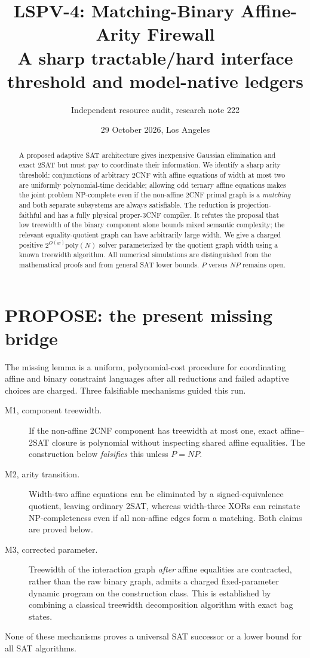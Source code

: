 \documentclass[11pt]{article}
\title{LSPV-4: Matching-Binary Affine-Arity Firewall\\\large A sharp tractable/hard interface threshold and model-native ledgers}
\author{Independent resource audit, research note 222}
\date{29 October 2026, Los Angeles}
\begin{document}
\maketitle
\begin{abstract}
A proposed adaptive SAT architecture gives inexpensive Gaussian elimination and exact 2SAT but must pay to coordinate their information. We identify a sharp arity threshold: conjunctions of arbitrary 2CNF with affine equations of width at most two are uniformly polynomial-time decidable; allowing odd ternary affine equations makes the joint problem NP-complete even if the non-affine 2CNF primal graph is a \emph{matching} and both separate subsystems are always satisfiable. The reduction is projection-faithful and has a fully physical proper-3CNF compiler. It refutes the proposal that low treewidth of the binary component alone bounds mixed semantic complexity; the relevant equality-quotient graph can have arbitrarily large width. We give a charged positive $2^{O(w)}\mathrm{poly}(N)$ solver parameterized by the quotient graph width using a known treewidth algorithm. All numerical simulations are distinguished from the mathematical proofs and from general SAT lower bounds. $P$ versus $NP$ remains open.
\end{abstract}

\section{PROPOSE: the present missing bridge}
The missing lemma is a uniform, polynomial-cost procedure for coordinating affine and binary constraint languages after all reductions and failed adaptive choices are charged. Three falsifiable mechanisms guided this run.
\begin{description}
\item[M1, component treewidth.] If the non-affine 2CNF component has treewidth at most one, exact affine--2SAT closure is polynomial without inspecting shared affine equalities. The construction below \emph{falsifies} this unless $P=NP$.
\item[M2, arity transition.] Width-two affine equations can be eliminated by a signed-equivalence quotient, leaving ordinary 2SAT, whereas width-three XORs can reinstate NP-completeness even if all non-affine edges form a matching. Both claims are proved below.
\item[M3, corrected parameter.] Treewidth of the interaction graph \emph{after} affine equalities are contracted, rather than the raw binary graph, admits a charged fixed-parameter dynamic program on the construction class. This is established by combining a classical treewidth decomposition algorithm with exact bag states.
\end{description}
None of these mechanisms proves a universal SAT successor or a lower bound for all SAT algorithms.
\end{document}
